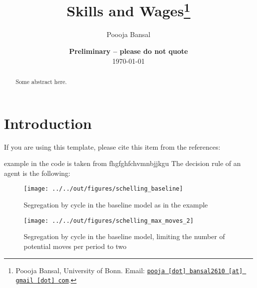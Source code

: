 \documentclass[11pt, a4paper, leqno]{article}
\begin{document}
\title{Skills and Wages\thanks{Poooja Bansal, University of Bonn. Email: \href{mailto:pooja.bansal2610@gmail.com}{\nolinkurl{pooja [dot] bansal2610 [at] gmail [dot] com}}.}}

\author{Poooja Bansal}

\date{
{\bf Preliminary -- please do not quote} 
\\[1ex] 
\today
}

\maketitle


\begin{abstract}
	Some abstract here.
\end{abstract}
\clearpage

\section{Introduction} %
\label{sec:introduction}

If you are using this template, please cite this item from the references: \citet{GaudeckerEconProjectTemplates}

\citet{Schelling69} example in the code is taken from \citet{StachurskiSargent13}
fhgfghfchvmnbjjkgu
The decision rule of an agent is the following:


\begin{figure}
    \caption{Segregation by cycle in the baseline \citet{Schelling69} model as in the \citet{StachurskiSargent13} example}
    
    \texttt{[image: ../../out/figures/schelling\_baseline]}

\end{figure}


\begin{figure}
    \caption{Segregation by cycle in the baseline \citet{Schelling69} model, limiting the number of potential moves per period to two}
    
    \texttt{[image: ../../out/figures/schelling\_max\_moves\_2]}

\end{figure}





\printbibliography
{}





\end{document}

